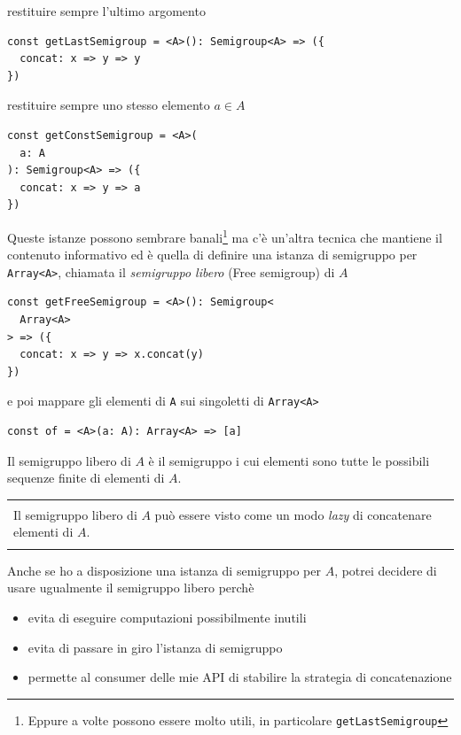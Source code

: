 \documentclass[12pt]{article}
\newenvironment{boxed}
    {\begin{center}
    \begin{tabular}{|p{0.9\textwidth}|}
    \hline\\
    }
    {
    \\\\\hline
    \end{tabular}
    \end{center}
    }
\begin{document}
restituire sempre l'ultimo argomento

\begin{verbatim}
const getLastSemigroup = <A>(): Semigroup<A> => ({
  concat: x => y => y
})
\end{verbatim}

restituire sempre uno stesso elemento $a \in A$

\begin{verbatim}
const getConstSemigroup = <A>(
  a: A
): Semigroup<A> => ({
  concat: x => y => a
})
\end{verbatim}

Queste istanze possono sembrare banali\footnote{Eppure a volte possono essere molto utili, in particolare \texttt{getLastSemigroup}}
ma c'è un'altra tecnica che mantiene il contenuto informativo ed è quella di definire una istanza di semigruppo per \texttt{Array<A>},
chiamata il \emph{semigruppo libero} (Free semigroup) di $A$

\begin{verbatim}
const getFreeSemigroup = <A>(): Semigroup<
  Array<A>
> => ({
  concat: x => y => x.concat(y)
})
\end{verbatim}

e poi mappare gli elementi di \texttt{A} sui singoletti di \texttt{Array<A>}

\begin{verbatim}
const of = <A>(a: A): Array<A> => [a]
\end{verbatim}

Il semigruppo libero di $A$ è il semigruppo i cui elementi sono tutte le possibili sequenze finite di elementi di $A$.

\begin{boxed}
Il semigruppo libero di $A$ può essere visto come un modo \emph{lazy} di concatenare elementi di $A$.
\end{boxed}

Anche se ho a disposizione una istanza di semigruppo per $A$, potrei decidere di usare ugualmente il semigruppo libero perchè

\begin{itemize}
  \item evita di eseguire computazioni possibilmente inutili
  \item evita di passare in giro l'istanza di semigruppo
  \item permette al consumer delle mie API di stabilire la strategia di concatenazione
\end{itemize}
\end{document}
